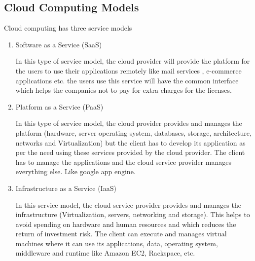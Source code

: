 \subsection{Cloud Computing Models}
Cloud computing has three service models
\par
\begin{enumerate}
    \item Software as a Service (SaaS)
    \par
        In this type of service model, the cloud provider will provide the platform for the users to use their applications remotely like mail services , e-commerce applications etc. the users use this service will have the common interface which helps the companies not to pay for extra charges for the licenses\cite{deploy}.%
    \item Platform as a Service (PaaS)
    \par
        In this type of service model, the cloud provider provides and manages the platform (hardware, server operating system, databases, storage, architecture, networks and Virtualization) but the client has to develop its application as per the need using these services provided by the cloud provider. The client has to manage the applications and the cloud service provider manages everything else. Like google app engine\cite{deploy}.%
    \item Infrastructure as a Service (IaaS)
    \par
        In this service model, the cloud service provider provides and manages the infrastructure (Virtualization, servers, networking and storage). This helps to avoid spending on hardware and human resources and which reduces the return of investment risk. The client can execute and manages virtual machines where it can use its applications, data, operating system, middleware and runtime like Amazon EC2, Rackspace, etc\cite{deploy}.%
\end{enumerate}
